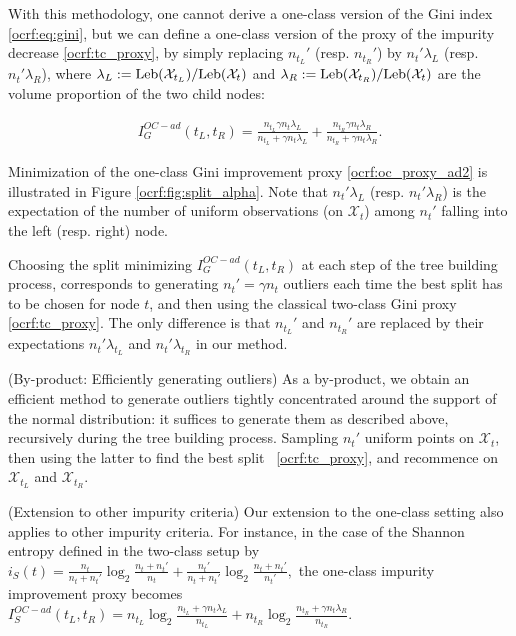 With this methodology, one cannot derive a one-class version of the Gini index \eqref{ocrf:eq:gini}, but we can define a one-class version of the proxy of the impurity decrease \eqref{ocrf:tc_proxy}, by simply replacing $n_{t_L}'$ (resp. $n_{t_R}'$) by $n_t' \lambda_L$ (resp. $n_t' \lambda_R$), where $\lambda_L := \text{Leb}(\mathcal{X}_{t_L}) / \text{Leb}(\mathcal{X}_{t})$ and $\lambda_R := \text{Leb}(\mathcal{X}_{t_R}) / \text{Leb}(\mathcal{X}_{t})$ are the volume proportion of the two child nodes:

\begin{align}
\label{ocrf:oc_proxy_ad2}
I_G^{OC-ad}(t_L, t_R)= \frac{n_{t_L} \gamma n_t \lambda_L}{n_{t_L} + \gamma n_t \lambda_L} + \frac{n_{t_R} \gamma n_t \lambda_R}{n_{t_R} + \gamma n_t \lambda_R}.
\end{align}

Minimization of the one-class Gini improvement proxy \eqref{ocrf:oc_proxy_ad2} is illustrated in Figure \ref{ocrf:fig:split_alpha}. %
Note that $n_t'\lambda_L$ (resp. $n_t'\lambda_R$) is the expectation of the number of uniform  observations (on $\mathcal{X}_t$) among $n_t'$ falling into the left (resp. right) node.

Choosing the split minimizing $I_G^{OC-ad}(t_L, t_R)$ at each step of the tree building process, corresponds to generating $n_t' = \gamma n_t$ outliers each time the best split has to be chosen for node $t$, and then using the classical two-class Gini proxy \eqref{ocrf:tc_proxy}. The only difference is that $n_{t_L}'$ and $n_{t_R}'$ are replaced by their expectations $n_t'\lambda_{t_L}$ and $n_t'\lambda_{t_R}$ in our method.

\begin{remark}({\sc By-product: Efficiently generating outliers})
As a by-product, we obtain an efficient method to generate outliers tightly concentrated around the support of the normal distribution: it suffices to generate them as described above, recursively during the tree building process. Sampling $n_t'$ uniform points on $\mathcal{X}_t$, then using the latter to find the best split \wrt~\eqref{ocrf:tc_proxy}, and recommence on $\mathcal{X}_{t_L}$ and $\mathcal{X}_{t_R}$.
\end{remark}


\begin{remark}({\sc Extension to other impurity criteria})
Our extension to the one-class setting also applies to other impurity criteria. For instance, in the case of the Shannon entropy defined in the two-class setup by
$i_S(t) = \frac{n_t}{n_t + n_t'} \log_2 \frac{n_t + n_t'}{n_t} + \frac{n_t'}{n_t + n_t'} \log_2 \frac{n_t + n_t'}{n_t'},$
the one-class impurity improvement proxy becomes
$I_S^{OC-ad}(t_L, t_R) = n_{t_L} \log_2 \frac{n_{t_L} + \gamma n_t \lambda_L}{n_{t_L}} + n_{t_R} \log_2 \frac{n_{t_R} + \gamma n_t \lambda_R}{n_{t_R}}.$
\end{remark}

